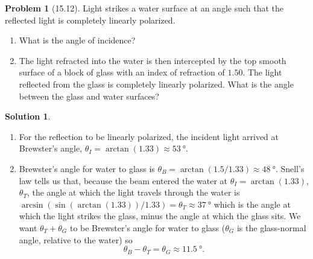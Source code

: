 \documentclass[10pt]{article}
\theoremstyle{definition}
\newtheorem{problem}{Problem}
\newtheorem{soln}{Solution}
\begin{document}
\begin{problem}[15.12]
Light strikes a water surface at an angle such that the reflected light is completely linearly polarized.
\begin{enumerate}[label=(\alph*)]
  \item What is the angle of incidence?
  \item The light refracted into the water is then intercepted by the top smooth surface of a block of glass with an index of refraction of $1.50$.
        The light reflected from the glass is completely linearly polarized. What is the angle between the glass and water surfaces?
\end{enumerate}
\end{problem}
\begin{soln}~
  \begin{enumerate}[label=(\alph*)]
    \item For the reflection to be linearly polarized, the incident light arrived at Brewster's angle, $\theta_I=\arctan(1.33)\approx \qty{53}{\degree}$.
    \item Brewster's angle for water to glass is $\theta_B=\arctan(1.5/1.33)\approx \qty{48}{\degree}$. Snell's law tells us that, because the beam entered
          the water at $\theta_I=\arctan(1.33)$, $\theta_T$, the angle at which the light travels
          through the water is $\arcsin(\sin(\arctan(1.33))/1.33)=\theta_T\approx \qty{37}{\degree}$
          which is the angle at which the light strikes the glass, minus the angle at which the glass sits. We want $\theta_T+\theta_G$ to be
          Brewster's angle for water to glass ($\theta_G$ is the glass-normal angle, relative to the water) so
          $$\theta_B-\theta_T=\theta_G\approx \qty{11.5}{\degree}.$$
  \end{enumerate}
\end{soln}
\end{document}
